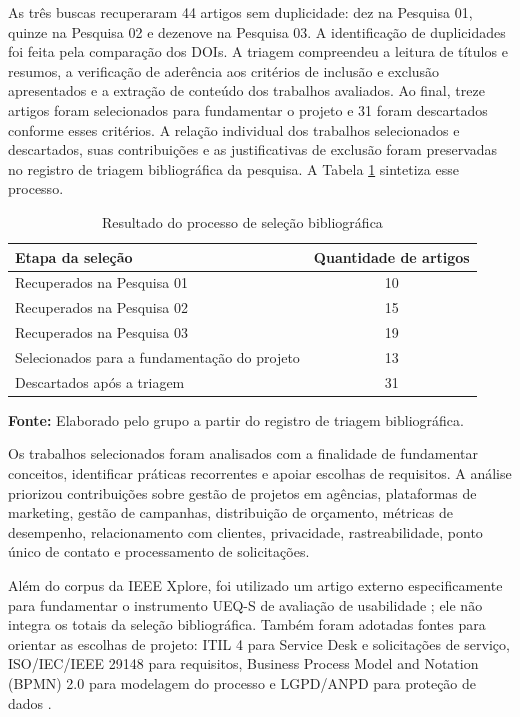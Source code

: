 As três buscas recuperaram 44 artigos sem duplicidade: dez na Pesquisa 01, quinze na Pesquisa 02 e dezenove na Pesquisa 03. A identificação de duplicidades foi feita pela comparação dos DOIs. A triagem compreendeu a leitura de títulos e resumos, a verificação de aderência aos critérios de inclusão e exclusão apresentados e a extração de conteúdo dos trabalhos avaliados. Ao final, treze artigos foram selecionados para fundamentar o projeto e 31 foram descartados conforme esses critérios. A relação individual dos trabalhos selecionados e descartados, suas contribuições e as justificativas de exclusão foram preservadas no registro de triagem bibliográfica da pesquisa. A Tabela \ref{tab:selecao-bibliografica} sintetiza esse processo.

\begin{table}[H]
\centering
\caption{Resultado do processo de seleção bibliográfica}
\label{tab:selecao-bibliografica}
\begin{tabular}{lc}
\hline
\textbf{Etapa da seleção} & \textbf{Quantidade de artigos} \\
\hline
Recuperados na Pesquisa 01 & 10 \\
Recuperados na Pesquisa 02 & 15 \\
Recuperados na Pesquisa 03 & 19 \\
Selecionados para a fundamentação do projeto & 13 \\
Descartados após a triagem & 31 \\
\hline
\end{tabular}
\par\footnotesize\textbf{Fonte:} Elaborado pelo grupo a partir do registro de triagem bibliográfica.
\end{table}

Os trabalhos selecionados foram analisados com a finalidade de fundamentar conceitos, identificar práticas recorrentes e apoiar escolhas de requisitos. A análise priorizou contribuições sobre gestão de projetos em agências, plataformas de marketing, gestão de campanhas, distribuição de orçamento, métricas de desempenho, relacionamento com clientes, privacidade, rastreabilidade, ponto único de contato e processamento de solicitações.

Além do corpus da IEEE Xplore, foi utilizado um artigo externo especificamente para fundamentar o instrumento UEQ-S de avaliação de usabilidade \cite{schrepp2017}; ele não integra os totais da seleção bibliográfica. Também foram adotadas fontes para orientar as escolhas de projeto: ITIL 4 para Service Desk e solicitações de serviço, ISO/IEC/IEEE 29148 para requisitos, Business Process Model and Notation (BPMN) 2.0 para modelagem do processo e LGPD/ANPD para proteção de dados \cite{servicedesk2023,servicerequest2020,iso29148,omg2011,brasil2018,anpd2021}.

